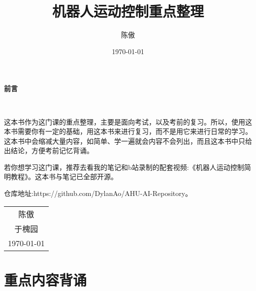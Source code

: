 \documentclass[12pt, a4paper, oneside]{ctexbook}
\title{{\Huge{\textbf{机器人运动控制重点整理}}}}
\author{陈傲}
\date{\today}
\begin{document}
\maketitle

\setcounter{page}{1}

\begin{center}
    \Huge\textbf{前言}
\end{center}~\

这本书作为这门课的重点整理，主要是面向考试，以及考前的复习。所以，使用这本书需要你有一定的基础，用这本书来进行复习，而不是用它来进行日常的学习。这本书中会缩减大量内容，如简单、学一遍就会内容不会列出，而且这本书中只给出结论，方便考前记忆背诵。

若你想学习这门课，推荐去看我的笔记和b站录制的配套视频:《机器人运动控制简明教程》。这本书与笔记已全部开源。

仓库地址:https://github.com/DylanAo/AHU-AI-Repository。
~\\
\begin{flushright}
    \begin{tabular}{c}
        陈傲\\
        于槐园\\
        \today
    \end{tabular}
\end{flushright}

\newpage
{}
\setcounter{page}{1}
\tableofcontents
\newpage
\setcounter{page}{1}
\chapter{重点内容背诵}
\end{document}
